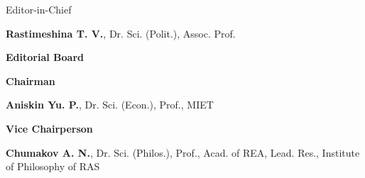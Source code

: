 
\begin{otherlanguage}{english}


\begin{center}
    Editor-in-Chief

    \textbf{Rastimeshina T. V.}, {Dr. Sci. (Polit.), Assoc. Prof.}
\end{center}

\noindent
\begin{minipage}[t]{.48\textwidth}
    \begin{flushleft}
        \footnotesize
\begin{center}
\textbf{Editorial Board}
\end{center}

\textbf{Chairman}

\textbf{Aniskin Yu. P.}, Dr. Sci. (Econ.), Prof., MIET

\vspace{1em}
\textbf{Vice Chairperson}

\textbf{Chumakov A. N.}, Dr. Sci. (Philos.), Prof., Acad. of REA,
Lead. Res., Institute of Philosophy of RAS


\end{flushleft}
\end{minipage}
\end{otherlanguage}
